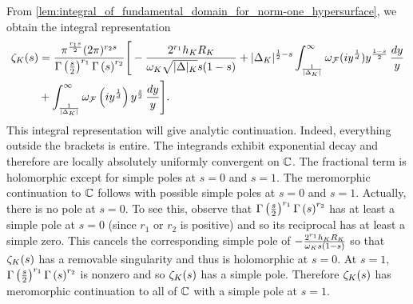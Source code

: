       From \cref{lem:integral_of_fundamental_domain_for_norm-one_hypersurface}, we obtain the integral representation
      \begin{equation}\label{equ:integral_representation_Dedekind_final}
        \begin{aligned}
          \zeta_{K}(s) &= \frac{\pi^{\frac{r_{1}s}{2}}(2\pi)^{r_{2}s}}{\Gamma\left(\frac{s}{2}\right)^{r_{1}}\Gamma\left(s\right)^{r_{2}}}\Bigg[-\frac{2^{r_{1}}h_{K}R_{K}}{\omega_{K}\sqrt{|\Delta|_{K}}s(1-s)}+|\Delta_{K}|^{\frac{1}{2}-s}\int_{\frac{1}{|\Delta_{K}|}}^{\infty}\omega_{\mathcal{F}}(iy^{\frac{1}{d}})y^{\frac{1-s}{2}}\,\frac{dy}{y} \\
          &+ \int_{\frac{1}{|\Delta_{K}|}}^{\infty}\omega_{\mathcal{F}}\left(iy^{\frac{1}{d}}\right)y^{\frac{s}{2}}\,\frac{dy}{y}\Bigg].
        \end{aligned}
      \end{equation}
      This integral representation will give analytic continuation. Indeed, everything outside the brackets is entire. The integrands exhibit exponential decay and therefore are locally absolutely uniformly convergent on $\mathbb{C}$. The fractional term is holomorphic except for simple poles at $s = 0$ and $s = 1$. The meromorphic continuation to $\mathbb{C}$ follows with possible simple poles at $s = 0$ and $s = 1$. Actually, there is no pole at $s = 0$. To see this, observe that $\Gamma\left(\frac{s}{2}\right)^{r_{1}}\Gamma\left(s\right)^{r_{2}}$ has at least a simple pole at $s = 0$ (since $r_{1}$ or $r_{2}$ is positive) and so its reciprocal has at least a simple zero. This cancels the corresponding simple pole of $-\frac{2^{r_{1}}h_{K}R_{K}}{\omega_{K}s(1-s)}$ so that $\zeta_{K}(s)$ has a removable singularity and thus is holomorphic at $s = 0$. At $s = 1$, $\Gamma\left(\frac{s}{2}\right)^{r_{1}}\Gamma\left(s\right)^{r_{2}}$ is nonzero and so $\zeta_{K}(s)$ has a simple pole. Therefore $\zeta_{K}(s)$ has meromorphic continuation to all of $\mathbb{C}$ with a simple pole at $s = 1$. 
